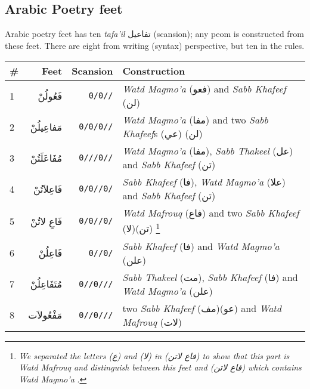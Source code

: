 \subsection{Arabic Poetry feet}

Arabic poetry feet has ten \textit{tafa'il} \textarabic{تفاعيل} (scansion); any peom is constructed from these feet. There are eight from writing (syntax) perspective, but ten in the rules.
\begin{savenotes}

  \begin{table}[t]
    \centering
    \begin{tabular}{l r r l}
      \hline
      \textbf{\#} & \textbf{Feet} & \textbf{Scansion} & \textbf{Construction} \\
      \hline
      1 & \textarabic{فَعُولُنْ}  & \texttt{0/0//} & \textit{Watd Magmo'a} (\textarabic{فعو}) and \textit{Sabb Khafeef} (\textarabic{لن})   \\
      2 &\textarabic{مَفاعِيلُنْ}& \texttt{0/0/0//} & \textit{Watd Magmo'a} (\textarabic{مفا}) and two \textit{Sabb Khafeef}s (\textarabic{عي}) (\textarabic{لن})   \\
      3 &\textarabic{مُفَاعَلَتُنْ}& \texttt{0///0//}  &    \textit{Watd Magmo'a} (\textarabic{مفا}), \textit{Sabb Thakeel} (\textarabic{عل}) and \textit{Sabb Khafeef} (\textarabic{تن}) \\
      4 &\textarabic{فَاعِلاَتُنْ} & \texttt{0/0//0/}   & \textit{Sabb Khafeef} (\textarabic{فا}), \textit{Watd Magmo'a} (\textarabic{علا}) and \textit{Sabb Khafeef} (\textarabic{تن})   \\
      5 &\textarabic{فَاعِ لاتُنْ} & \texttt{0/0//0/}  &  \textit{Watd Mafrouq} (\textarabic{فاع}) and two \textit{Sabb Khafeef} (\textarabic{لا})(\textarabic{تن}) \footnote{\textit{We separated the letters (\textarabic{ع}) and (\textarabic{لا}) in (\textarabic{فاع لاتن}) to show that this part is \textit{Watd Mafrouq} and distinguish between this feet  and (\textarabic{فاع لاتن}) which contains \textit{Watd Magmo'a}  }.}  \\
      6 &\textarabic{فَاعِلُنْ}  & \texttt{0//0/}   & \textit{Sabb Khafeef} (\textarabic{فا}) and \textit{Watd Magmo'a} (\textarabic{علن})\\
      7 &\textarabic{مُتَفَاعِلُنْ}& \texttt{0//0///}  & \textit{Sabb Thakeel} (\textarabic{مت}), \textit{Sabb Khafeef} (\textarabic{فا}) and \textit{Watd Magmo'a} (\textarabic{علن})  \\
      8 &\textarabic{مَفْعُولاَت} & \texttt{0//0///}   & two \textit{Sabb Khafeef} (\textarabic{مف})(\textarabic{عو}) and \textit{Watd Mafrouq} (\textarabic{لات}) \\

\end{tabular}
\end{table}
\end{savenotes}
